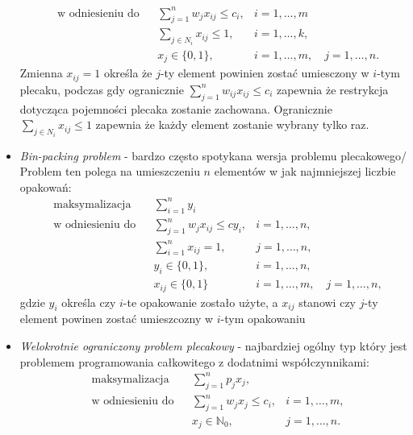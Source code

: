 \begin{itemize}
\begin{equation}
\begin{aligned}
      & \textrm{w odniesieniu do} & & \sum_{j=1}^n  w_jx_{ij} \le c_i, & i =1,\dots,m \\
      &&& \sum_{j \in N_i} x_{ij} \le 1, & i =1,\dots,k, \\
      &&& x_j \in\{0,1\},& i = 1,\dots,m, \quad j =1,\dots,n.
    \end{aligned}
  \end{equation}
  Zmienna $x_{ij} = 1$ określa że $j$-ty element powinien zostać umiesczony w $i$-tym plecaku, podczas gdy ogranicznie $\sum_{j=1}^n  w_{ij}x_{ij} \le c_i$ zapewnia że restrykcja dotycząca pojemności plecaka zostanie zachowana. Ogranicznie $\sum_{j \in N_i} x_{ij} \le 1$ zapewnia że każdy element zostanie wybrany tylko raz.
  \item \textit{Bin-packing problem} - bardzo często spotykana wersja problemu plecakowego/ Problem ten polega na umieszczeniu $n$ elementów w jak najmniejszej liczbie opakowań:
  \begin{equation}\label{binPacking}
    \begin{aligned}
      & \textrm{maksymalizacja} & & \sum_{i=1}^n y_i \\
      & \textrm{w odniesieniu do} & & \sum_{j=1}^n w_jx_{ij} \le cy_i, & i=1,\dots,n, \\
      &&& \sum_{i=1}^n x_{ij} = 1, & j=1,\dots,n, \\
      &&& y_i \in \{0,1\}, & i=1,\dots,n, \\
      &&& x_{ij} \in \{0,1\} & i=1,\dots,m, \quad j = 1,\dots,n,
    \end{aligned}
  \end{equation}
  gdzie $y_i$ określa czy $i$-te opakowanie zostało użyte, a $x_{ij}$ stanowi czy $j$-ty element powinen zostać umieszcozny w $i$-tym opakowaniu
  \item \textit{Welokrotnie ograniczony problem plecakowy} - najbardziej ogólny typ który jest problemem programowania całkowitego z dodatnimi współczynnikami:
  \begin{equation}\label{generalKnapsack}
    \begin{aligned}
      & \textrm{maksymalizacja} & & \sum_{j=1}^n p_jx_j, \\
      & \textrm{w odniesieniu do} & & \sum_{j=1}^n w_jx_j \le c_i, & i=1,\dots,m, \\
      &&& x_j \in \mathbb{N}_0, & j = 1,\dots,n.
    \end{aligned}
  \end{equation}
\end{itemize}

